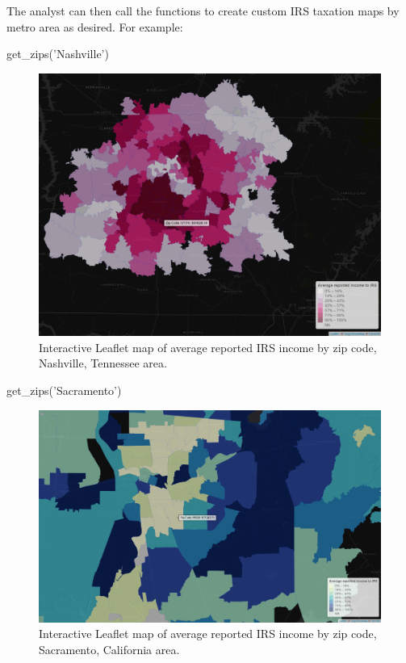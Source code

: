 The analyst can then call the functions to create custom IRS taxation
maps by metro area as desired. For example:

\begin{Schunk}
\begin{Sinput}
get_zips('Nashville') %
\end{Sinput}
\end{Schunk}

\begin{figure}[htbp]
  \centering
  \includegraphics[width=\textwidth]{nashville}
  \caption{Interactive Leaflet map of average reported IRS income by zip code, Nashville, Tennessee area.}
  \label{figure:nashville}
\end{figure}

\begin{Schunk}
\begin{Sinput}
get_zips('Sacramento') %
\end{Sinput}
\end{Schunk}

\begin{figure}[htbp]
  \centering
  \includegraphics[width=\textwidth]{sacramento}
  \caption{Interactive Leaflet map of average reported IRS income by zip code, Sacramento, California area.}
  \label{figure:sacramento}
\end{figure}

